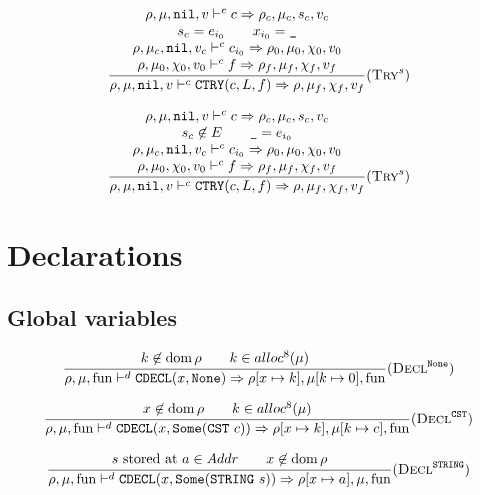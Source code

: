 \[\dfrac{\begin{array}{c}
    \rho,\mu,\texttt{nil},v \vdash^c c \Rightarrow \rho_c,\mu_c,s_c,v_c \\
    s_c = e_{i_0} \qquad x_{i_0} = \texttt{\_} \\
    \rho,\mu_c,\texttt{nil},v_c \vdash^c c_{i_0} \Rightarrow \rho_0,\mu_0,\chi_0,v_0 \\
    \rho,\mu_0,\chi_0,v_0 \vdash^c f \Rightarrow \rho_f,\mu_f,\chi_f,v_f
\end{array}}{\rho,\mu,\texttt{nil},v \vdash^c \texttt{CTRY}(c, L, f) \Rightarrow \rho,\mu_f,\chi_f,v_f} (\textsc{Try}^s)\]

\[\dfrac{\begin{array}{c}
    \rho,\mu,\texttt{nil},v \vdash^c c \Rightarrow \rho_c,\mu_c,s_c,v_c \\
    s_c \not\in E \qquad \texttt{\_} = e_{i_0} \\
    \rho,\mu_c,\texttt{nil},v_c \vdash^c c_{i_0} \Rightarrow \rho_0,\mu_0,\chi_0,v_0 \\
    \rho,\mu_0,\chi_0,v_0 \vdash^c f \Rightarrow \rho_f,\mu_f,\chi_f,v_f
\end{array}}{\rho,\mu,\texttt{nil},v \vdash^c \texttt{CTRY}(c, L, f) \Rightarrow \rho,\mu_f,\chi_f,v_f} (\textsc{Try}^s)\]

\section{Declarations}
\subsection{Global variables}

\[\dfrac{\begin{array}{c}
    k\not\in\operatorname{dom}\rho \qquad k \in alloc^8(\mu)
\end{array}}{\rho,\mu,\text{fun} \vdash^d \texttt{CDECL}(x, \texttt{None}) \Rightarrow \rho[x\mapsto k],\mu[k\mapsto 0],\text{fun}} (\textsc{Decl}^{\texttt{None}})\]

\[\dfrac{\begin{array}{c}
    x\not\in\operatorname{dom}\rho \qquad k \in alloc^8(\mu)
\end{array}}{\rho,\mu,\text{fun} \vdash^d \texttt{CDECL}(x, \texttt{Some}(\texttt{CST}\ c)) \Rightarrow \rho[x\mapsto k],\mu[k\mapsto c],\text{fun}} (\textsc{Decl}^{\texttt{CST}})\]

\[\dfrac{\begin{array}{c}
    s\text{ stored at }a\in Addr \qquad x\not\in\dom\rho \\
\end{array}}{\rho,\mu,\fun \gives^d \t{CDECL}(x, \t{Some}(\t{STRING}\ s)) \tto \rho[x\mapsto a],\mu,\fun} \rule{Decl}{^\t{STRING}}\]

